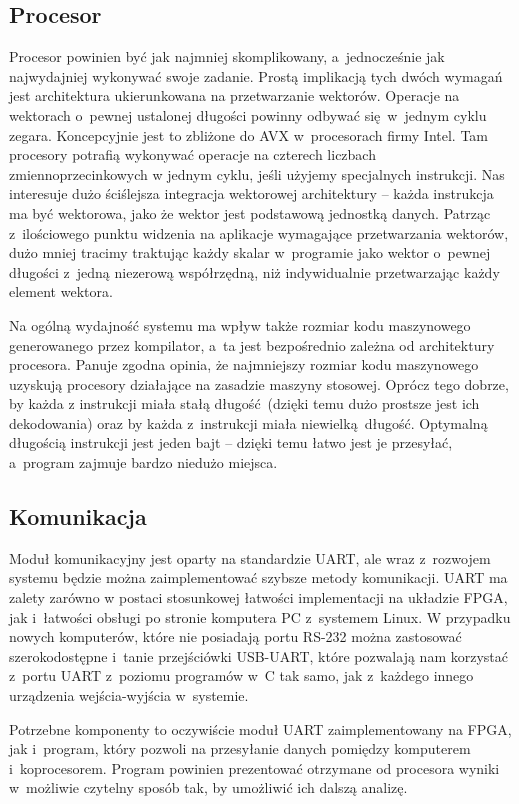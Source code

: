 \subsection{Procesor}
Procesor powinien być jak najmniej skomplikowany, a~jednocześnie jak najwydajniej wykonywać swoje zadanie. Prostą implikacją tych dwóch wymagań jest architektura ukierunkowana na przetwarzanie wektorów. Operacje na wektorach o~pewnej ustalonej długości powinny odbywać się w~jednym cyklu zegara. Koncepcyjnie jest to zbliżone do AVX w~procesorach firmy Intel. Tam procesory potrafią wykonywać operacje na czterech liczbach zmiennoprzecinkowych w jednym cyklu, jeśli użyjemy specjalnych instrukcji. Nas interesuje dużo ściślejsza integracja wektorowej architektury -- każda instrukcja ma być wektorowa, jako że wektor jest podstawową jednostką danych. Patrząc z~ilościowego punktu widzenia na aplikacje wymagające przetwarzania wektorów, dużo mniej tracimy traktując każdy skalar w~programie jako wektor o~pewnej długości z~jedną niezerową współrzędną, niż indywidualnie przetwarzając każdy element wektora.

Na ogólną wydajność systemu ma wpływ także rozmiar kodu maszynowego generowanego przez kompilator, a~ta jest bezpośrednio zależna od architektury procesora. Panuje zgodna opinia, że najmniejszy rozmiar kodu maszynowego uzyskują procesory działające na zasadzie maszyny stosowej. Oprócz tego dobrze, by każda z instrukcji miała stałą długość (dzięki temu dużo prostsze jest ich dekodowania) oraz by każda z~instrukcji miała niewielką długość. Optymalną długością instrukcji jest jeden bajt -- dzięki temu łatwo jest je przesyłać, a~program zajmuje bardzo niedużo miejsca.

\subsection{Komunikacja}
Moduł komunikacyjny jest oparty na standardzie UART, ale wraz z~rozwojem systemu będzie można zaimplementować szybsze metody komunikacji. UART ma zalety zarówno w postaci stosunkowej łatwości implementacji na układzie FPGA, jak i~łatwości obsługi po stronie komputera PC z~systemem Linux. W przypadku nowych komputerów, które nie posiadają portu RS-232 można zastosować szerokodostępne i~tanie przejściówki USB-UART, które pozwalają nam korzystać z~portu UART z~poziomu programów w~C tak samo, jak z~każdego innego urządzenia wejścia-wyjścia w~systemie.

Potrzebne komponenty to oczywiście moduł UART zaimplementowany na FPGA, jak i~program, który pozwoli na przesyłanie danych pomiędzy komputerem i~koprocesorem. Program powinien prezentować otrzymane od procesora wyniki w~możliwie czytelny sposób tak, by umożliwić ich dalszą analizę.

